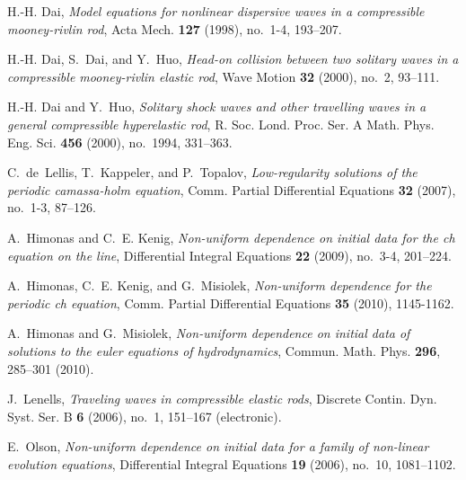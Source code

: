 \documentclass[12pt,reqno]{amsart}
\begin{document}
\begin{thebibliography}{dLKT07}
H.-H. Dai, \emph{Model equations for nonlinear dispersive waves in a
  compressible mooney-rivlin rod}, Acta Mech. \textbf{127} (1998), no.~1-4,
  193--207.

H.-H. Dai, S.~Dai, and Y.~Huo, \emph{Head-on collision between two solitary
  waves in a compressible mooney-rivlin elastic rod}, Wave Motion \textbf{32}
  (2000), no.~2, 93--111.

H.-H. Dai and Y.~Huo, \emph{Solitary shock waves and other travelling waves in
  a general compressible hyperelastic rod}, R. Soc. Lond. Proc. Ser. A Math.
  Phys. Eng. Sci. \textbf{456} (2000), no.~1994, 331--363.

C.~de~Lellis, T.~Kappeler, and P.~Topalov, \emph{Low-regularity solutions of
  the periodic camassa-holm equation}, Comm. Partial Differential Equations
  \textbf{32} (2007), no.~1-3, 87--126.

A.~Himonas and C.~E. Kenig, \emph{Non-uniform dependence on initial data for
  the ch equation on the line}, Differential Integral Equations \textbf{22}
  (2009), no.~3-4, 201--224.

A.~Himonas, C.~E. Kenig, and G.~Misiolek, \emph{Non-uniform dependence for the
  periodic ch equation}, 
  Comm. Partial Differential Equations {\bf 35}  (2010), 1145-1162. 
  
A.~Himonas and G.~Misiolek, \emph{Non-uniform dependence on initial data of
  solutions to the euler equations of hydrodynamics}, 
 Commun. Math. Phys. {\bf 296}, 285--301 (2010).

J.~Lenells, \emph{Traveling waves in compressible elastic rods}, Discrete
  Contin. Dyn. Syst. Ser. B \textbf{6} (2006), no.~1, 151--167 (electronic).

E.~Olson, \emph{Non-uniform dependence on initial data for a family of
  non-linear evolution equations}, Differential Integral Equations \textbf{19}
  (2006), no.~10, 1081--1102.

\end{thebibliography}

%
%
\end{document}

